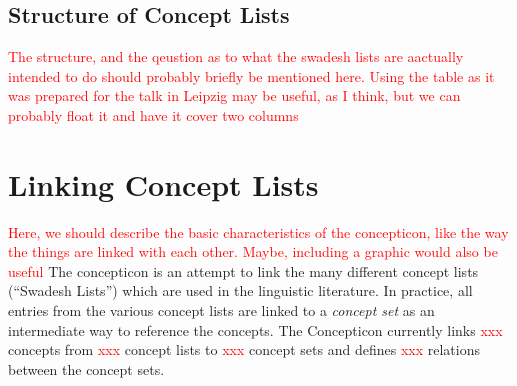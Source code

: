 \documentclass[10pt, a4paper]{article}
\newcommand{\conceptnumber}{\textcolor{red}{xxx} }
\newcommand{\listnumber}{\textcolor{red}{xxx} }
\newcommand{\setnumber}{\textcolor{red}{xxx} }
\newcommand{\relationnumber}{\textcolor{red}{xxx} }
\begin{document}
\subsection{Structure of Concept Lists}
\textcolor{red}{The structure, and the qeustion as to what the swadesh lists are aactually intended
to do should probably briefly be mentioned here. Using the table as it was prepared for the talk in
Leipzig may be useful, as I think, but we can probably float it and have it cover two columns}

\section{Linking Concept Lists}
\textcolor{red}{Here, we should describe the basic characteristics of the concepticon, like the way
the things are linked with each other. Maybe, including a graphic would also be useful}
The concepticon is an attempt to link the many different concept lists (``Swadesh Lists'') which are
used in the linguistic literature. In practice, all entries from the various concept lists are
linked to a \emph{concept set} as an intermediate way to reference the concepts. The Concepticon
currently links \conceptnumber concepts from \listnumber concept lists to \setnumber concept sets
and defines \relationnumber relations between the concept sets.
 
\end{document}
